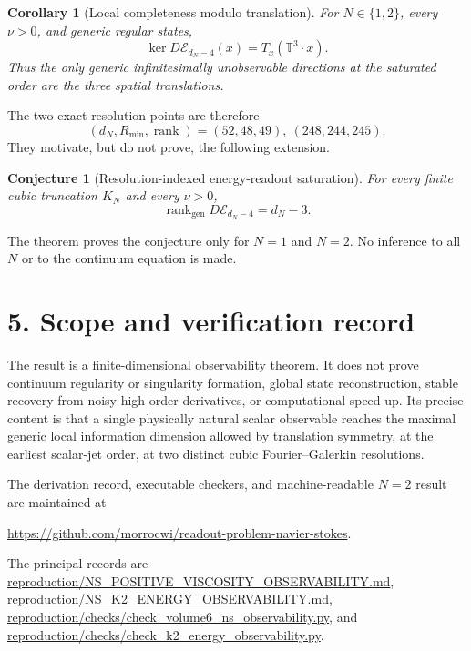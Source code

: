 \documentclass[10pt,leqno,twoside]{article}
\newcommand{\T}{\mathbb T}
\newcommand{\rankgen}{\operatorname{rank}_{\mathrm{gen}}}
\theoremstyle{plain}
\newtheorem{corollary}{Corollary}
\newtheorem{conjecture}{Conjecture}
\theoremstyle{remark}
\begin{document}
\begin{corollary}[Local completeness modulo translation]
For $N\in\{1,2\}$, every $\nu>0$, and generic regular states,
\begin{equation}
\boxed{
\ker D\mathcal E_{d_N-4}(x)=T_x(\T^3\!\cdot x).
}
\end{equation}
Thus the only generic infinitesimally unobservable directions at the saturated order are the
three spatial translations.
\end{corollary}

The two exact resolution points are therefore
\begin{equation}
\boxed{
(d_N,R_{\min},\operatorname{rank})=(52,48,49),\ (248,244,245).
}
\end{equation}
They motivate, but do not prove, the following extension.

\begin{conjecture}[Resolution-indexed energy-readout saturation]
For every finite cubic truncation $K_N$ and every $\nu>0$,
\begin{equation}
\boxed{\rankgen D\mathcal E_{d_N-4}=d_N-3.}
\end{equation}
\end{conjecture}

The theorem proves the conjecture only for $N=1$ and $N=2$.  No inference to all $N$ or to
the continuum equation is made.

\section*{5. Scope and verification record}

The result is a finite-dimensional observability theorem.  It does not prove continuum
regularity or singularity formation, global state reconstruction, stable recovery from noisy
high-order derivatives, or computational speed-up.  Its precise content is that a single
physically natural scalar observable reaches the maximal generic local information dimension
allowed by translation symmetry, at the earliest scalar-jet order, at two distinct cubic
Fourier--Galerkin resolutions.

The derivation record, executable checkers, and machine-readable $N=2$ result are maintained at
\begin{center}
{\small\url{https://github.com/morrocwi/readout-problem-navier-stokes}}.
\end{center}
The principal records are
{\small\url{reproduction/NS_POSITIVE_VISCOSITY_OBSERVABILITY.md}},
{\small\url{reproduction/NS_K2_ENERGY_OBSERVABILITY.md}},
{\small\url{reproduction/checks/check_volume6_ns_observability.py}}, and
{\small\url{reproduction/checks/check_k2_energy_observability.py}}.
\end{document}
